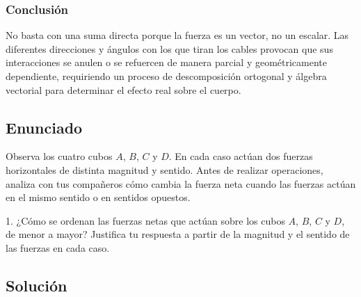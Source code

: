 \documentclass[12pt, a4paper]{article}
\begin{document}
\subsubsection*{Conclusión}
No basta con una suma directa porque la fuerza es un vector, no un escalar. Las diferentes direcciones y ángulos con los que tiran los cables provocan que sus interacciones se anulen o se refuercen de manera parcial y geométricamente dependiente, requiriendo un proceso de descomposición ortogonal y álgebra vectorial para determinar el efecto real sobre el cuerpo.

\newpage

\subsection*{Enunciado}
Observa los cuatro cubos $A$, $B$, $C$ y $D$. En cada caso actúan dos fuerzas horizontales de distinta magnitud y sentido. Antes de realizar operaciones, analiza con tus compañeros cómo cambia la fuerza neta cuando las fuerzas actúan en el mismo sentido o en sentidos opuestos.

\begin{center}
\end{center}

1. ¿Cómo se ordenan las fuerzas netas que actúan sobre los cubos $A$, $B$, $C$ y $D$, de menor a mayor? Justifica tu respuesta a partir de la magnitud y el sentido de las fuerzas en cada caso.

\subsection*{Solución}
\end{document}
